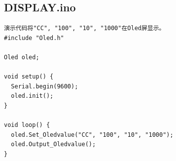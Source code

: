\documentclass{article}
\begin{document}
\subsection{DISPLAY.ino}
\begin{lstlisting}
演示代码将"CC", "100", "10", "1000"在Oled屏显示。
#include "Oled.h"

Oled oled;

void setup() {
  Serial.begin(9600);
  oled.init();
}

void loop() {
  oled.Set_Oledvalue("CC", "100", "10", "1000");
  oled.Output_Oledvalue();
}
\end{lstlisting}
\end{document}
